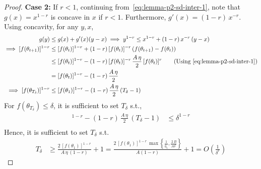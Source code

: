 \documentclass{article}
\newcommand{\tht}{\theta_t}
\newcommand{\thtt}{\theta_{t+1}}
\begin{document}
\begin{proof}
\textbf{Case 2:} If $r < 1$, continuing from~\cref{eq:lemma-p2-sd-inter-1}, note that $g(x) = x^{1-r}$ is concave in $x$ if $r < 1$. Furthermore, $g'(x) = (1-r) \, x^{-r}$. Using concavity, for any $y, x$, 
\begin{align*}
g(y) & \leq g(x) + g'(x) (y - x) \implies y^{1 - r} \leq x^{1 - r} +  (1-r) \, x^{-r} \, (y - x) \\
\implies [f(\thtt)]^{1 - r} & \leq [f(\tht)]^{1-r} + (1-r) \, [f(\tht)]^{-r} \, (f(\thtt) - f(\tht)) \\
& \leq [f(\tht)]^{1-r} - (1-r) \, [f(\tht)]^{-r} \,  \frac{A \, \eta}{2} \,  [f(\tht)]^r \tag{Using~\cref{eq:lemma-p2-sd-inter-1}} \\
& = [f(\tht)]^{1-r} - (1-r) \, \frac{A \, \eta}{2} \\
\implies [f(\theta_{T_\delta})]^{1 - r} & \leq [f(\theta_1)]^{1-r} - (1-r) \, \frac{A \, \eta}{2} \, (T_\delta -1)
\end{align*}
For $f(\theta_{T_\delta}) \leq \delta$, it is sufficient to set $T_\delta$ s.t., 
\begin{align*}
[f(\theta_1)]^{1-r} - (1-r) \, \frac{A \, \eta}{2} \, (T_\delta -1) & \leq \delta^{1-r}  \\
\end{align*}
Hence, it is sufficient to set $T_\delta$ s.t. 
\begin{align*}
T_{\delta} & \geq \frac{2 \, [f(\theta_1)]^{1-r}}{A \, \eta \, (1-r)} + 1 = \frac{2 \, [f(\theta_1)]^{1-r} \, \max\left\{\frac{1}{\bar{\eta}_1}, \frac{2 \, B}{A \delta^r}\right\}}{A (1-r)}  + 1 = O \left( \frac{1}{\delta^r} \right)
\end{align*}


\end{proof}
\end{document}
